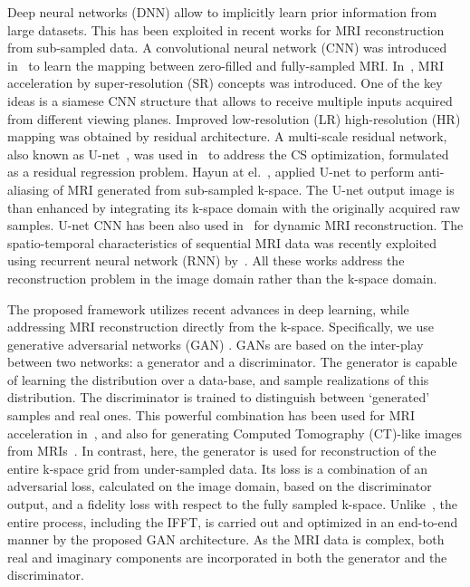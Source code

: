 \documentclass[review]{elsarticle}
\begin{document}
Deep neural networks (DNN) allow to implicitly learn prior information from large datasets. This has been exploited in recent works for MRI reconstruction from sub-sampled data. A convolutional neural network (CNN) was introduced in~\cite{wang2016accelerating} to learn the mapping between zero-filled and fully-sampled MRI.
In~\cite{Oktay2016}, MRI acceleration by super-resolution (SR) concepts was introduced. One of the key ideas is a siamese CNN structure that allows to receive multiple inputs acquired from different viewing planes. Improved low-resolution (LR) high-resolution (HR) mapping was obtained by residual architecture.
A multi-scale residual network, also known as U-net~\cite{ronneberger2015u}, was used in~\cite{lee2017deep} to address the CS optimization, formulated as a residual regression problem.
Hayun at el.~\cite{hyun2017deep}, applied U-net to perform anti-aliasing of MRI generated from sub-sampled k-space. The U-net output image is than enhanced by integrating its k-space domain with the originally acquired raw samples. U-net CNN has been also used in~\cite{sandinodeep} for dynamic MRI reconstruction.
The spatio-temporal characteristics of sequential MRI data was recently exploited using recurrent neural network (RNN) by~\cite{qin2017convolutional}. All these works address the reconstruction problem in the image domain rather than the k-space domain.

The proposed framework utilizes recent advances in deep learning, while addressing MRI reconstruction directly from the k-space. Specifically, we use generative adversarial networks (GAN) \cite{goodfellow2014generative,radford2015unsupervised,pathak2016context}.
GANs are based on the inter-play between two networks: a generator and a discriminator. The generator is capable of learning the distribution over a data-base, and sample realizations of this distribution. 
The discriminator is trained to distinguish between `generated' samples and real ones. This powerful combination has been used for MRI acceleration in~\cite{yu2017deep,mardani2017deep}, and also for generating Computed Tomography (CT)-like images from MRIs~\cite{nie2016medical}.
In contrast, here, the generator is used for reconstruction of the entire k-space grid from under-sampled data. Its loss is a combination of an adversarial loss, calculated on the image domain, based on the discriminator output, and a fidelity loss with respect to the fully sampled k-space. Unlike~\cite{hyun2017deep}, the entire process, including the IFFT, is carried out and optimized in an end-to-end manner by the proposed GAN architecture. As the MRI data is complex, both real and imaginary components are incorporated in both the generator and the discriminator. 
\end{document}
